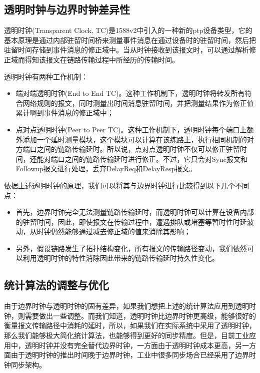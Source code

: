 \subsection{透明时钟与边界时钟差异性}
透明时钟(Transparent Clock, TC)是1588v2中引入的一种新的ptp设备类型，它的基本原理是通过内部驻留时间桥来测量事件消息在通过设备时的驻留时间，然后把驻留时间存储到事件消息的修正域中。当从时钟接收到该报文时，可以通过解析修正域而得知该报文在链路传输过程中所经历的传输时间。

透明时钟有两种工作机制：
\begin{itemize}[noitemsep,topsep=0pt,parsep=0pt,partopsep=0pt]
  \item 端对端透明时钟(End to End TC)。这种工作机制下，透明时钟将转发所有符合网络规则的报文，同时测量出时间消息驻留时间，并把测量结果作为修正值累计啊到事件消息的修正域中；
  \item 点对点透明时钟(Peer to Peer TC)。这种工作机制下，透明时钟每个端口上额外添加一个延时测量模块，这个模块可以计算在该练路上，执行相同机制的对方端口之间的链路传输延时。所以说，点对点透明时钟不仅可以修正驻留时间，还能对端口之间的链路传输延时进行修正。不过，它只会对Sync报文和Followup报文进行处理，丢弃DelayReq和DelayResp报文。
\end{itemize}

依据上述透明时钟的原理，我们可以将其与边界时钟进行比较得到以下几个不同点：
\begin{itemize}[noitemsep,topsep=0pt,parsep=0pt,partopsep=0pt]
  \item 首先，边界时钟完全无法测量链路传输延时，而透明时钟可以计算在设备内部的驻留时间，因此，即使报文在传输过程中，遭遇排队或堵塞等暂时性时延波动，从时钟仍然能够通过减去修正域的值来消除其影响；
  \item 另外，假设链路发生了拓扑结构变化，所有报文的传输路径变动，我们依然可以利用透明时钟的特性消除因此带来的链路传输延时持久性变化。
\end{itemize}

\subsection{统计算法的调整与优化}
由于边界时钟与透明时钟的固有差异，如果我们想把上述的统计算法应用到透明时钟，则需要做出一些调整。而我们知道，透明时钟比边界时钟更高级，能够很好的衡量报文传输路径中消耗的延时，所以，如果我们在实际系统中采用了透明时钟，那么我们能够极大简化统计算法，也能够得到更好的同步精度。但是，目前工业应用中，透明时钟并没有完全替代边界时钟，一方面由于透明时钟成本更高，另一方面由于透明时钟的推出时间晚于边界时钟，工业中很多同步场合已经采用了边界时钟同步架构。

